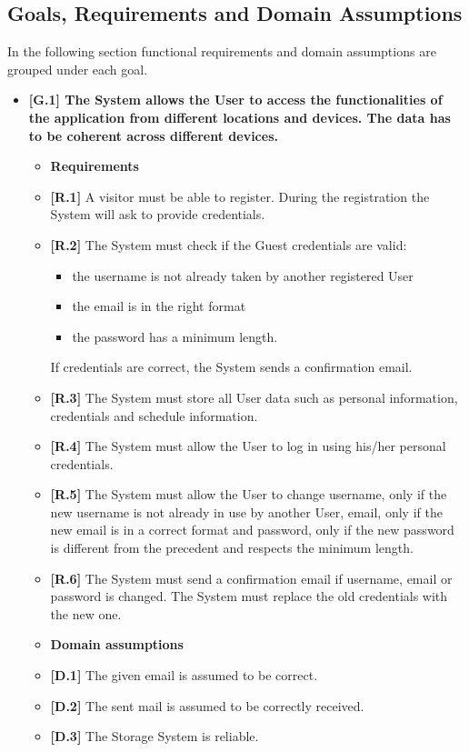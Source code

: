 \subsection{Goals, Requirements and Domain Assumptions}
In the following section functional requirements and domain assumptions are grouped under each goal.
\begin{itemize}
	\item \textbf{[G.1] The System allows the User to access the functionalities of the application from different locations and devices. The data has to be coherent across different devices.}
	\begin{itemize}
		\item [] \textbf{Requirements}
		\item \textbf{[R.1]} A visitor must be able to register. During the registration the System will ask to provide credentials.
		\item \textbf{[R.2]} The System must check if the Guest credentials are valid: 
		\begin{itemize}
			\item the username is not already taken by another registered User
			\item the email is in the right format
			\item the password has a minimum length.
		\end{itemize} If credentials are correct, the System sends a confirmation email.
		\item \textbf{[R.3]} The System must store all User data such as personal information, credentials and schedule information.
		\item \textbf{[R.4]} The System must allow the User to log in using his/her personal credentials.
		\item \textbf{[R.5]} The System must allow the User to change username, only if the new username is not already in use by another User, email, only if the new email is in a correct format and password, only if the new password is different from the precedent and respects the minimum length.
		\item \textbf{[R.6]} The System must send a confirmation email if username, email or password is changed. The System must replace the old credentials with the new one.
		\item [] \textbf{Domain assumptions}
		\item \textbf{[D.1]} The given email is assumed to be correct.
		\item \textbf{[D.2]} The sent mail is assumed to be correctly received.
		\item \textbf{[D.3]} The Storage System is reliable.
	\end{itemize}


\end{itemize}
